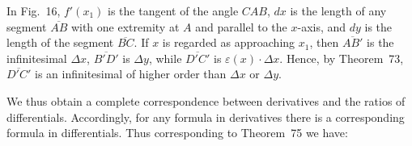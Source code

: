 \documentclass[a4paper,12pt]{book}[2004/02/16]
\providecommand{\hyperlink}[2]{#2}
\theoremstyle{ilemma}
\theoremstyle{itheorem}
\theoremstyle{iother}
\theoremstyle{icorollary}
\theoremstyle{numcorollary}
\theoremstyle{idefinition}
\begin{document}
In Fig.~\hyperlink{fig16}{16}, $f'(x_1)$ is the tangent of the angle $CAB$, $dx$ is the
length of any segment $\overline{AB}$ with one extremity at $A$ and
parallel to the $x$-axis, and $dy$ is the length of the segment
$\overline{BC}$. If $x$ is regarded as approaching $x_1$, then
$\overline{AB'}$ is the infinitesimal $\Delta x$, $\overline{B'D'}$ is
$\Delta y$, while $\overline{D'C'}$ is $\varepsilon(x) \cdot \Delta
x$. Hence, by Theorem~\hyperlink{thm73}{73}, $\overline{D'C'}$ is an infinitesimal of
higher order than $\Delta x$ or $\Delta y$.

We thus obtain a complete correspondence between derivatives and the
ratios of differentials. Accordingly, for any formula in derivatives
there is a corresponding formula in differentials.  Thus corresponding
to Theorem~\hyperlink{thm75}{75} we have:
\end{document}
